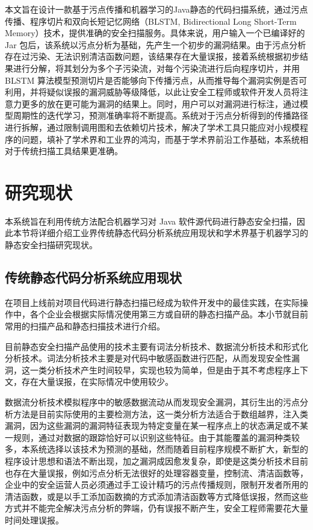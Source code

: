 本文旨在设计一款基于污点传播和机器学习的Java静态的代码扫描系统，通过污点传播、程序切片和双向长短记忆网络（BLSTM, Bidirectional Long Short-Term Memory）技术，提供准确的安全扫描服务。具体来说，用户输入一个已编译好的 Jar 包后，该系统以污点分析为基础，先产生一个初步的漏洞结果。由于污点分析存在过污染、无法识别清洁函数问题，该结果存在大量误报，接着系统根据初步结果进行分解，将其划分为多个子污染流，对每个污染流进行后向程序切片，并用 BLSTM 算法模型预测切片是否能够向下传播污点，从而推导每个漏洞实例是否可利用，并将疑似误报的漏洞威胁等级降低，以此让安全工程师或软件开发人员将注意力更多的放在更可能为漏洞的结果上。同时，用户可以对漏洞进行标注，通过模型周期性的迭代学习，预测准确率将不断提高。系统对于污点分析得到的传播路径进行拆解，通过限制调用图和去依赖切片技术，解决了学术工具只能应对小规模程序的问题，填补了学术界和工业界的鸿沟，而基于学术界前沿工作基础，本系统相对于传统扫描工具结果更准确。

\section{研究现状}
本系统旨在利用传统方法配合机器学习对 Java 软件源代码进行静态安全扫描，因此本节将详细介绍工业界传统静态代码分析系统应用现状和学术界基于机器学习的静态安全扫描研究现状。\\

\subsection{传统静态代码分析系统应用现状}

在项目上线前对项目代码进行静态扫描已经成为软件开发中的最佳实践，在实际操作中，各个企业会根据实际情况使用第三方或自研的静态扫描产品。本小节就目前常用的扫描产品和静态扫描技术进行介绍。

目前静态安全扫描产品使用的技术主要有词法分析技术、数据流分析技术和形式化分析技术。词法分析技术主要是对代码中敏感函数进行匹配，从而发现安全性漏洞，这一类分析技术产生时间较早，实现也较为简单，但是由于其不考虑程序上下文，存在大量误报，在实际情况中使用较少。

数据流分析技术模拟程序中的敏感数据流动从而发现安全漏洞，其衍生出的污点分析方法是目前实际使用的主要检测方法，这一类分析方法适合于数组越界，注入类漏洞，因为这些漏洞的漏洞特征表现为特定变量在某一程序点上的状态满足或不某一规则，通过对数据的跟踪恰好可以识别这些特征。由于其能覆盖的漏洞种类较多，本系统选择以该技术为预测的基础，然而随着目前程序规模不断扩大，新型的程序设计思想和语法不断出现，加之漏洞成因愈发复杂，即使是这类分析技术目前也存在大量误报，例如污点分析无法很好的处理容器变量，控制流、清洁函数等，企业中的安全运营人员必须通过手工设计精巧的污点传播规则，限制开发者所用的清洁函数，或是以手工添加函数摘的方式添加清洁函数等方式降低误报，然而这些方式并不能完全解决污点分析的弊端，仍有误报不断产生，安全工程师需要花大量时间处理误报。
   
